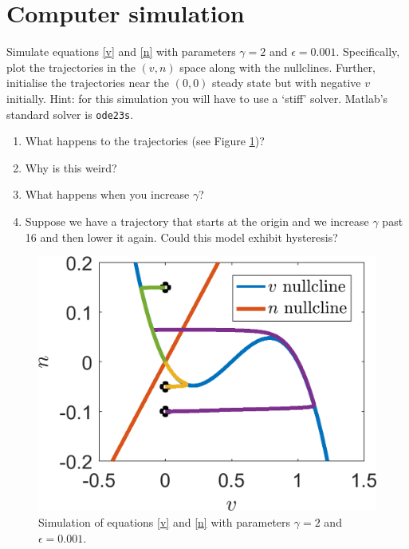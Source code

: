 \documentclass[]{article}
\newcommand{\see}[1]{(see Figure \ref{#1})}
\newcommand{\eqns}[2]{equations \eqref{#1} and \eqref{#2}}
\newcommand{\ttp}{.45\textwidth}
\begin{document}
\section{Computer simulation}
Simulate \eqns{v}{n} with parameters $\gamma=2$ and $\epsilon=0.001$. Specifically, plot the trajectories in the $(v,n)$ space along with the nullclines. Further, initialise the trajectories near the $(0,0)$ steady state but with negative $v$ initially. Hint: for this simulation you will have to use a `stiff' solver. Matlab's standard solver is \texttt{ode23s}. 
\begin{enumerate}
\item What happens to the trajectories \see{Fitzhugh_Nagumo_sims}?
\item Why is this weird?
\item What happens when you increase $\gamma$?
\item Suppose we have a trajectory that starts at the origin and we increase $\gamma$ past 16 and then lower it again. Could this model exhibit hysteresis?
\end{enumerate} 
\begin{figure}[h!!!tb]
\centering
\includegraphics[width=\ttp]{../../Pictures/Fitzhugh_Nagumo_sims.png}
\caption{Simulation of \eqns{v}{n} with parameters $\gamma=2$ and $\epsilon=0.001$.\label{Fitzhugh_Nagumo_sims}}
\end{figure}
\end{document}
